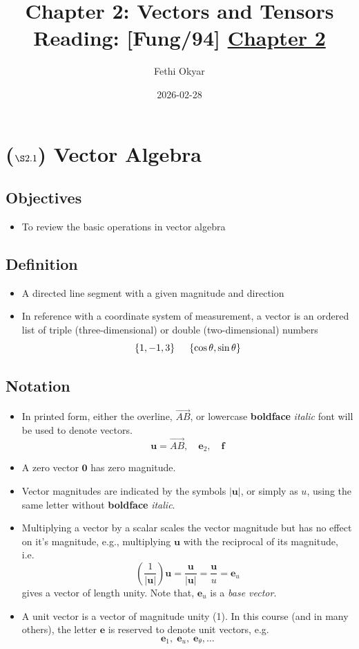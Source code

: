 \documentclass[11pt]{article}
\author{Fethi Okyar}
\date{2026-02-28}
\title{Chapter 2: Vectors and Tensors\\\medskip
\large Reading: [Fung/94] \href{../textbook\_excerpts/1\_TensorAlgebra.pdf}{Chapter 2}}
\begin{document}
\maketitle
\setcounter{tocdepth}{1}
\tableofcontents

\section*{(\(\S 2.1\)) Vector Algebra}
\label{sec:org9f4e509}
\subsection*{Objectives}
\label{sec:org1f4e9ab}
\begin{itemize}
\item To review the basic operations in vector algebra
\end{itemize}
\subsection*{Definition}
\label{sec:org6c75e1f}
\begin{itemize}
\item A directed line segment with a given magnitude and direction
\item In reference with a coordinate system of measurement, a vector is an ordered list of triple (three-dimensional) or double (two-dimensional) numbers
$$ \{ 1, -1, 3\}   \hspace{1.5em} \{ \cos\theta, \sin\theta \} $$
\end{itemize}
\subsection*{Notation}
\label{sec:orgb76fca0}
\begin{itemize}
\item In printed form, either the overline, \(\vec{AB}\), or lowercase \textbf{boldface} \emph{italic} font will be used to denote vectors.
$$ \boldsymbol{u}=\vec{AB}, \hspace{1em} \boldsymbol{e}_2, \hspace{1em} \boldsymbol{f} $$
\item A zero vector \(\boldsymbol{0}\) has zero magnitude.
\item Vector magnitudes are indicated by the symbols \(|\boldsymbol{u}|\), or simply as \(u\), using the same letter without \textbf{boldface} \emph{italic}.
\item Multiplying a vector by a scalar scales the vector magnitude but has no effect on it's magnitude, e.g., multiplying \(\boldsymbol{u}\) with the reciprocal of its magnitude, i.e.
$$ \left( \frac{1}{|\boldsymbol{u}|} \right) \boldsymbol{u} = \frac{\boldsymbol{u}}{|\boldsymbol{u}|} = \frac{\boldsymbol{u}}{u} = \boldsymbol{e}_u $$
gives a vector of length unity. Note that, \(\boldsymbol{e}_u\) is a \emph{base vector}.
\item A unit vector is a vector of magnitude unity (1). In this course (and in many others), the letter \(\boldsymbol{e}\) is reserved to denote unit vectors, e.g.
$$ \boldsymbol{e}_1,\; \boldsymbol{e}_u,\; \boldsymbol{e}_\theta,\ldots $$
\end{itemize}
\end{document}
